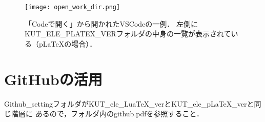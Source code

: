 \begin{figure}[tb]
  \centering
  \texttt{[image: open\_work\_dir.png]}
  \caption{
    「Codeで開く」から開かれたVSCodeの一例．
    左側にKUT\_ELE\_PLATEX\_VERフォルダの中身の一覧が表示されている（p\LaTeX の場合）．
  }
  \label{fig:open work dir}
\end{figure}

\section{GitHubの活用}
Github\_settingフォルダがKUT\_ele\_LuaTeX\_verとKUT\_ele\_pLaTeX\_verと同じ階層に
あるので，フォルダ内のgithub.pdfを参照すること．
